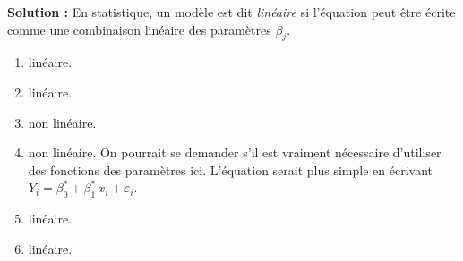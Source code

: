 \documentclass[letter, 11pt]{article}
\newcommand{\prof}[1]{\begin{professeur}\color{blue} {\bf Solution :} #1 \end{professeur}}
\begin{document}
\begin{enumerate}[leftmargin=*, wide, label=\bf Exercice \arabic*:]
\prof{ En statistique, un modèle est dit {\it linéaire} si l'équation peut être écrite comme une combinaison linéaire des paramètres $\beta_j$.
\begin{enumerate}
\item linéaire. 
\item linéaire. %
\item non linéaire.
\item non linéaire. On pourrait se demander s'il est vraiment nécessaire d'utiliser des fonctions des paramètres ici. L'équation serait plus simple en écrivant $Y_i=\beta_0^*+\beta_1^*\,x_i+\varepsilon_i$.
\item linéaire.
\item linéaire.
\end{enumerate}}

\end{enumerate}
\end{document}
